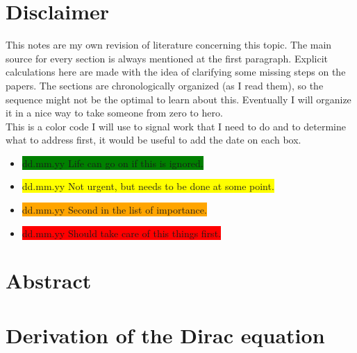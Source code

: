 \documentclass[11pt,twoside,a4paper]{article} %
\begin{document}

\tableofcontents %

\newpage %



\section*{Disclaimer}

This notes are my own revision of literature concerning this topic. The main source for every section is always mentioned at the first paragraph. Explicit calculations here are made with the idea of clarifying some missing steps on the papers. The sections are chronologically organized (as I read them), so the sequence might not be the optimal to learn about this. Eventually I will organize it in a nice way to take someone from zero to hero.\\

This is a color code I will use to signal work that I need to do and to determine what to address first, it would be useful to add the date on each box.

\begin{itemize}
    \item \colorbox{green}{dd.mm.yy Life can go on if this is ignored.}
    \item \colorbox{yellow}{dd.mm.yy Not urgent, but needs to be done at some point.}
    \item \colorbox{orange}{dd.mm.yy Second in the list of importance.}
    \item \colorbox{red}{dd.mm.yy Should take care of this things first.}
\end{itemize}

\section{Abstract}

\section{Derivation of the Dirac equation}\label{dirEq}

\end{document}
